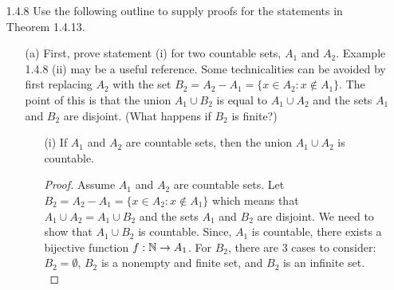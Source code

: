 \documentclass[12pt,letterpaper]{article}
\begin{document}
\begin{itemize}[leftmargin=!,labelindent=5pt]
\begin{itemize}
\begin{proof}
                        Assume for the sake of contradiction that $\alpha = \sup T$ and $\alpha ^2 > b$. Then, we get
                        \begin{align*}
                            (\alpha - \frac{1}{n})^2 &= \alpha^2 - \frac{2\alpha}{n} + \frac{1}{n^2} \\
                            &> \alpha^2 - \frac{2\alpha}{n}.
                        \end{align*}
                        Choose $n_0 \in \bbN$ such that $\alpha^2 - \frac{2\alpha}{n_0} > b$ (this is possible by the Archimedian Property and since $\alpha^2 > 2$).
                        So, $(\alpha - \frac{1}{n_0})^2 > \alpha^2 - \frac{2\alpha}{n_0} > b$. 
                        This means $\alpha - \frac{1}{n_0}$ must be an upper bound for $T$. 
                        However, $\alpha - \frac{1}{n_0} < \alpha$ which contradicts the initial claim that $\alpha = \sup T$ since a supremum of a set should be the smallest element amongst all the upper bounds for that set. 
                        So, $\alpha^2 \not > b$. \\

                        Since $(\sup T)^2 \not < b$ and $(\sup T)^2 \not > b$, $(\sup T)^2 = b$ and so $\sup T = \sqrt{b} \in \bbR$.
                    \end{proof}
            \end{itemize}
        \newpage
        \item[1.4.8] Use the following outline to supply proofs for the statements in Theorem 1.4.13.
            \begin{itemize}
                \item [(a)] First, prove statement (i) for two countable sets, $A_1$ and $A_2$. Example 1.4.8 (ii) may be a useful reference. Some technicalities can be avoided by first replacing $A_2$ with the set $B_2 = A_2-A_1 =\{x\in A_2 : x \not \in A_1\}$. The point of this is that the union $A_1 \cup B_2$ is equal to $A_1 \cup A_2$ and the sets $A_1$ and $B_2$ are disjoint. (What happens if $B_2$ is finite?)
                
                    \begin{itemize}
                        \item [(i)] If $A_1$ and $A_2$ are countable sets, then the union $A_1 \cup A_2$ is countable.
                            \begin{proof}
                                Assume $A_1$ and $A_2$ are countable sets. 
                                Let $B_2 = A_2-A_1 =\{x\in A_2 : x \not \in A_1\}$ which means that $A_1 \cup A_2 = A_1 \cup B_2$ and the sets $A_1$ and $B_2$ are disjoint. 
                                We need to show that $A_1 \cup B_2$ is countable.
                                Since, $A_1$ is countable, there exists a bijective function $f : \mathbb{N} \to A_1$.
                                For $B_2$, there are 3 cases to consider: $B_2 = \emptyset$, $B_2$ is a nonempty and finite set, and $B_2$ is an infinite set.\\
                                

\end{proof}
\end{itemize}
\end{itemize}
\end{itemize}
\end{document}
